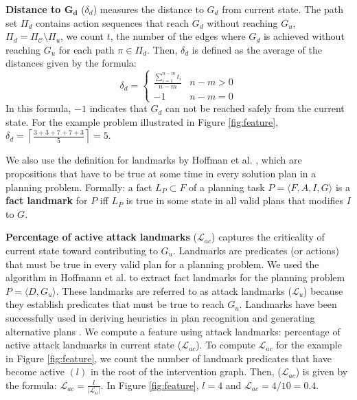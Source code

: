 \documentclass[letterpaper]{article}
\theoremstyle{plain}
\begin{document}
\textbf{Distance to $\boldsymbol{G_d}$} ($\delta_d$) measures the distance to $G_d$ from current state. The path set $\Pi_{d}$ contains action sequences that reach $G_d$ without reaching $G_u$, $\Pi_{d} = \Pi_{\mathcal{C}} \setminus \Pi_{u} $, we count  $t$, the number of the edges where $G_d$ is achieved without reaching $G_u$ for each path $\pi \in \Pi_{d}$. Then, $\delta_d$ is defined as the average of the distances given by the formula:
\begin{equation*} 
\delta_d = \left\{\begin{matrix}
\frac{\sum_{i=1}^{n-m}t_i}{n-m} & n-m>0\\ 
-1 &  n-m=0
\end{matrix}\right.
\end{equation*}
In this formula, $-1$ indicates that $G_d$ can not be reached safely from the current state. For the example problem illustrated in Figure \ref{fig:feature}, $\delta_d=\left \lceil \frac{3+3+7+7+3}{5} \right \rceil=5$.


We also use the definition for landmarks by Hoffman et al. , which are propositions that have to be true at some time in every solution plan in a planning problem. Formally: a fact $L_P \subset F$ of a planning task $ P = \langle F, A, I, G \rangle$ is a \textbf{fact landmark} for $P$ iff $L_P$ is true in some state in all valid plans that modifies $I$ to $G$.

\textbf{Percentage of active attack landmarks} ($\mathcal{L}_{ac}$) captures the criticality of current state toward contributing to $G_u$. 
Landmarks \cite{hoffman2004lm} are predicates (or actions) that must be true in every valid plan for a planning problem. We used the algorithm in Hoffmann et al.  to extract fact landmarks for the planning problem $P = \langle D, G_u\rangle$. These landmarks are referred to as attack landmarks ($\mathcal{L}_{u}$) because they establish predicates that must be true to reach $G_u$.  Landmarks have been successfully used in deriving heuristics in plan recognition \cite{vered2018goalrec} and generating alternative plans \cite{bryce2014diverse}. We compute a feature using attack landmarks: percentage of active attack landmarks in current state ($\mathcal{L}_{ac}$). To compute $\mathcal{L}_{ac}$ for the example in Figure \ref{fig:feature}, we count the number of landmark predicates that have become active $(l)$ in the root of the intervention graph. Then, ($\mathcal{L}_{ac}$) is given by the formula: $\mathcal{L}_{ac} = \frac{l}{\left |\mathcal{L}_{u}\right|}$. In Figure \ref{fig:feature}, $l=4$ and $\mathcal{L}_{ac}=4/10=0.4$.
\end{document}
